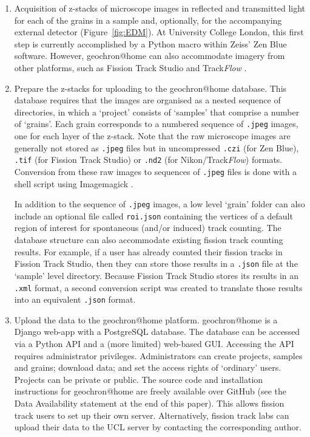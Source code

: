 \documentclass[gchron, manuscript]{copernicus}
\begin{document}
\begin{enumerate}
\item Acquisition of z-stacks of microscope images in reflected and
  transmitted light for each of the grains in a sample and,
  optionally, for the accompanying external detector
  (Figure~\ref{fig:EDM}). At University College London, this first
  step is currently accomplished by a Python macro within Zeiss' Zen
  Blue software.  However, geochron@home can also accommodate imagery
  from other platforms, such as Fission Track Studio
  \citep[Zeiss;][]{gleadow2009} and Track\emph{Flow}
  \citep[Nikon;][]{vanranst2019}.

\item Prepare the z-stacks for uploading to the geochron@home
  database. This database requires that the images are organised as a
  nested sequence of directories, in which a `project' consists of
  `samples' that comprise a number of `grains'.  Each grain
  corresponds to a numbered sequence of \texttt{.jpeg} images, one for
  each layer of the z-stack. Note that the raw microscope images are
  generally not stored as \texttt{.jpeg} files but in uncompressed
  \texttt{.czi} (for Zen Blue), \texttt{.tif} (for Fission Track
  Studio) or \texttt{.nd2} (for Nikon/Track\emph{Flow})
  formats. Conversion from these raw images to sequences of
  \texttt{.jpeg} files is done with a shell script using Imagemagick
  \citep{still2006}.\medskip

  In addition to the sequence of \texttt{.jpeg} images, a low level
  `grain' folder can also include an optional file called
  \texttt{roi.json} containing the vertices of a default region of
  interest for spontaneous (and/or induced) track counting. The
  database structure can also accommodate existing fission track
  counting results.  For example, if a user has already counted their
  fission tracks in Fission Track Studio, then they can store those
  results in a \texttt{.json} file at the `sample' level
  directory. Because Fission Track Studio stores its results in an
  \texttt{.xml} format, a second conversion script was created to
  translate those results into an equivalent \texttt{.json} format.

\item Upload the data to the geochron@home platform. geochron@home is
  a Django web-app with a PostgreSQL database.  The database can be
  accessed via a Python API and a (more limited) web-based
  GUI. Accessing the API requires administrator
  privileges. Administrators can create projects, samples and grains;
  download data; and set the access rights of `ordinary' users.
  Projects can be private or public. The source code and installation
  instructions for geochron@home are freely available over GitHub (see
  the Data Availability statement at the end of this paper). This
  allows fission track users to set up their own
  server. Alternatively, fission track labs can upload their data to
  the UCL server by contacting the corresponding author.


\end{enumerate}
\end{document}
